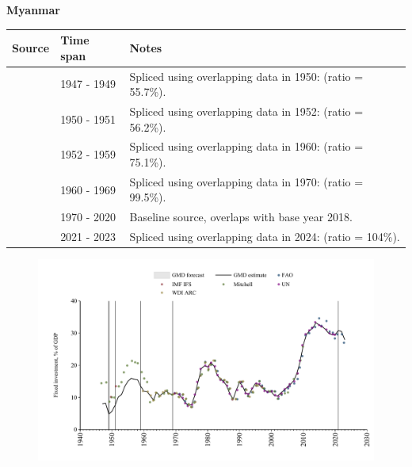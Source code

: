 \documentclass[12pt,a4paper,landscape]{article}
\begin{document}
\begin{adjustbox}{max totalsize={\paperwidth}{\paperheight},center}
\begin{minipage}[t][\textheight][t]{\textwidth}
\vspace*{0.5cm}
{}
\begin{center}
{\Large\bfseries Myanmar}
\end{center}
\vspace{0.5cm}
\begin{table}[H]
\centering
\small
\begin{tabular}{|l|l|l|}
\hline
\textbf{Source} & \textbf{Time span} & \textbf{Notes} \\
\hline
\rowcolor{white}\cite{Mitchell}& 1947 - 1949 &Spliced using overlapping data in 1950: (ratio = 55.7\%).\\
\rowcolor{lightgray}\cite{IMF_IFS}& 1950 - 1951 &Spliced using overlapping data in 1952: (ratio = 56.2\%).\\
\rowcolor{white}\cite{Mitchell}& 1952 - 1959 &Spliced using overlapping data in 1960: (ratio = 75.1\%).\\
\rowcolor{lightgray}\cite{WDI_ARC}& 1960 - 1969 &Spliced using overlapping data in 1970: (ratio = 99.5\%).\\
\rowcolor{white}\cite{UN}& 1970 - 2020 &Baseline source, overlaps with base year 2018.\\
\rowcolor{lightgray}\cite{FAO}& 2021 - 2023 &Spliced using overlapping data in 2024: (ratio = 104\%).\\
\hline
\end{tabular}
\end{table}
\begin{figure}[H]
\centering
\includegraphics[width=\textwidth,height=0.6\textheight,keepaspectratio]{graphs/MMR_finv_GDP.pdf}
\end{figure}
\end{minipage}
\end{adjustbox}
\end{document}
